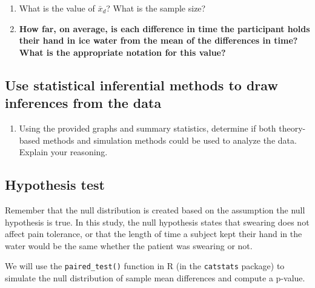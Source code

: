 \documentclass[
]{report}
\providecommand{\tightlist}{%
  \setlength{\itemsep}{0pt}\setlength{\parskip}{0pt}}
\begin{document}
\begin{enumerate}
\def\labelenumi{\arabic{enumi}.}
\setcounter{enumi}{5}
\item
  What is the value of \(\bar{x}_d\)? What is the sample size?
  \vspace{0.25in}
\item
  \textbf{How far, on average, is each difference in time the participant holds their hand in ice water from the mean of the differences in time? What is the appropriate notation for this value?}
\end{enumerate}

\vspace{0.4in}

\subsection*{Use statistical inferential methods to draw inferences from the data}\label{use-statistical-inferential-methods-to-draw-inferences-from-the-data-4}

\begin{enumerate}
\def\labelenumi{\arabic{enumi}.}
\setcounter{enumi}{7}
\tightlist
\item
  Using the provided graphs and summary statistics, determine if both theory-based methods and simulation methods could be used to analyze the data. Explain your reasoning.
\end{enumerate}

\vspace{1in}

\subsection*{Hypothesis test}\label{hypothesis-test-4}

Remember that the null distribution is created based on the assumption the null hypothesis is true. In this study, the null hypothesis states that swearing does not affect pain tolerance, or that the length of time a subject kept their hand in the water would be the same whether the patient was swearing or not.

We will use the \texttt{paired\_test()} function in R (in the \texttt{catstats} package) to simulate the null distribution of sample mean differences and compute a p-value.

\newpage
\end{document}
